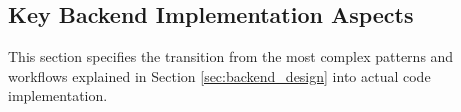 \subsection{Key Backend Implementation Aspects}

This section specifies the transition from the most complex patterns and workflows explained in Section \ref{sec:backend_design} into actual code implementation.




